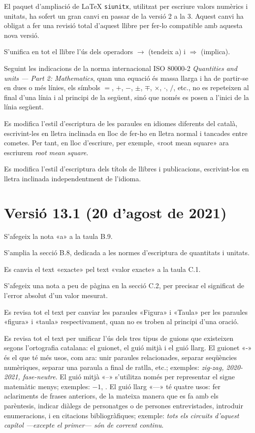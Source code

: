 El paquet d'ampliació de \LaTeX{} \texttt{siunitx}, utilitzat per escriure valors numèrics i unitats, ha sofert un gran canvi en passar de la versió 2 a la 3. Aquest canvi ha obligat a fer una  revisió total d'aquest llibre per  fer-lo compatible amb aquesta nova versió.

S'unifica en tot el llibre l'ús dels operadors $\rightarrow$ (tendeix a) i $\Rightarrow$ (implica).

Seguint les indicacions de la norma internacional ISO 80000-2 \textit{Quantities and units --- Part 2: Mathematics}, quan una equació és massa llarga i ha de partir-se en dues o més línies, els símbols $=$, $+$, $-$, $\pm$, $\mp$, $\times$, $\cdot$, $/$, etc., no es repeteixen al final d'una línia i al principi de la següent, sinó que només es posen a l'inici de la  línia següent.

Es modifica l'estil d'escriptura de les paraules en idiomes diferents del català, escrivint-les en lletra inclinada en lloc de fer-ho en lletra normal i tancades entre cometes. Per tant, en lloc d'escriure, per exemple, «root mean square» ara escriurem \textit{root mean square}.

Es modifica l'estil d'escriptura dels títols de llibres i publicacions, escrivint-los en lletra inclinada independentment de l'idioma.


\section*{Versió 13.1 (20 d'agost de 2021)}

S'afegeix la nota «a» a la taula B.9.

S'amplia la secció B.8, dedicada a les normes d'escriptura de quantitats i unitats.

Es canvia el text «exacte» pel text «valor exacte» a la taula C.1.

S'afegeix una nota a peu de pàgina en la secció C.2, per precisar el significat de l'error absolut d'un valor mesurat.

Es revisa tot el text per canviar les paraules «Figura» i «Taula» per les paraules «figura» i «taula» respectivament, quan no es troben al principi d'una oració.

Es revisa tot el text per unificar l'ús dels tres tipus de guions que existeixen segons l'ortografia catalana: el guionet, el guió mitjà i el guió llarg. El guionet  «-» és el que té més usos, com ara:  unir paraules relacionades, separar seqüències numèriques, separar una paraula a final de ratlla, etc.; exemples: \textit{zig-zag, 2020-2021, fase-neutre}. El guió mitjà  «--» s'utilitza només per representar el signe matemàtic menys; exemples: $-1$, . El  guió llarg  «---» té quatre usos: fer aclariments de frases anteriors, de la mateixa manera que es fa amb els parèntesis, indicar diàlegs de personatges o de persones entrevistades, introduir enumeracions, i en citacions bibliogràfiques; exemple: \textit{tots els circuits d'aquest capítol ---excepte el primer--- són de corrent continu}.


